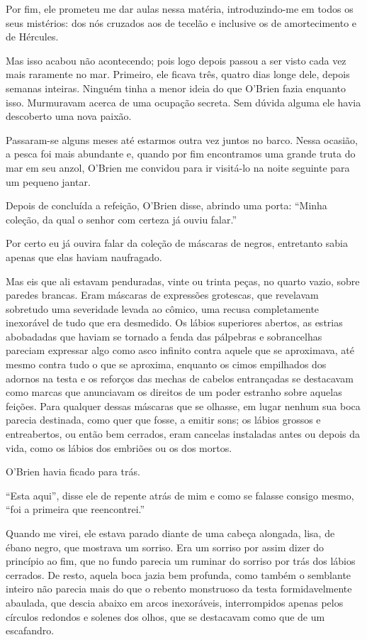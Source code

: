 Por fim, ele prometeu me dar aulas nessa matéria, introduzindo-me em
todos os seus mistérios: dos nós cruzados aos de tecelão e inclusive os
de amortecimento e de Hércules.

Mas isso acabou não acontecendo; pois logo depois passou a ser visto
cada vez mais raramente no mar. Primeiro, ele ficava três, quatro dias
longe dele, depois semanas inteiras. Ninguém tinha a menor ideia do que
O'Brien fazia enquanto isso. Murmuravam acerca de uma ocupação secreta.
Sem dúvida alguma ele havia descoberto uma nova paixão.

Passaram-se alguns meses até estarmos outra vez juntos no barco. Nessa
ocasião, a pesca foi mais abundante e, quando por fim encontramos uma
grande truta do mar em seu anzol, O'Brien me convidou para ir visitá-lo
na noite seguinte para um pequeno jantar.

Depois de concluída a refeição, O'Brien disse, abrindo uma porta:
``Minha coleção, da qual o senhor com certeza já ouviu falar.''

Por certo eu já ouvira falar da coleção de máscaras de negros,
entretanto sabia apenas que elas haviam naufragado.

Mas eis que ali estavam penduradas, vinte ou trinta peças, no quarto
vazio, sobre paredes brancas. Eram máscaras de expressões grotescas, que
revelavam sobretudo uma severidade levada ao cômico, uma recusa
completamente inexorável de tudo que era desmedido. Os lábios superiores
abertos, as estrias abobadadas que haviam se tornado a fenda das
pálpebras e sobrancelhas pareciam expressar algo como asco infinito
contra aquele que se aproximava, até mesmo contra tudo o que se
aproxima, enquanto os cimos empilhados dos adornos na testa e os
reforços das mechas de cabelos entrançadas se destacavam como marcas que
anunciavam os direitos de um poder estranho sobre aquelas feições. Para
qualquer dessas máscaras que se olhasse, em lugar nenhum sua boca
parecia destinada, como quer que fosse, a emitir sons; os lábios grossos
e entreabertos, ou então bem cerrados, eram cancelas instaladas antes ou
depois da vida, como os lábios dos embriões ou os dos mortos.

O'Brien havia ficado para trás.

``Esta aqui'', disse ele de repente atrás de mim e como se falasse
consigo mesmo, ``foi a primeira que reencontrei.''

Quando me virei, ele estava parado diante de uma cabeça alongada, lisa,
de ébano negro, que mostrava um sorriso. Era um sorriso por assim dizer
do princípio ao fim, que no fundo parecia um ruminar do sorriso por trás
dos lábios cerrados. De resto, aquela boca jazia bem profunda, como
também o semblante inteiro não parecia mais do que o rebento monstruoso
da testa formidavelmente abaulada, que descia abaixo em arcos
inexoráveis, interrompidos apenas pelos círculos redondos e solenes dos
olhos, que se destacavam como que de um escafandro.

